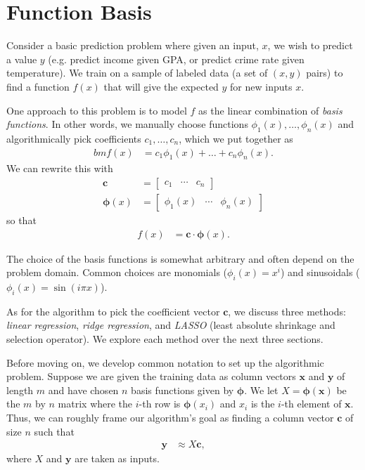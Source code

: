 \documentclass[10pt]{paper}
\begin{document}
\section{Function Basis}
Consider a basic prediction problem where given an input, $x$, we wish to predict a value $y$ (e.g. predict income given GPA, or predict crime rate given temperature). We train on a sample of labeled data (a set of $(x,y)$ pairs) to find a function $f(x)$ that will give the expected $y$ for new inputs $x$.

One approach to this problem is to model $f$ as the linear combination of \emph{basis functions}. In other words, we manually choose functions $\phi_1(x), \dots, \phi_n(x)$ and algorithmically pick coefficients $c_1, \dots, c_n$, which we put together as
\begin{align*}bm
f(x) &= c_1 \phi_1(x) + \dots + c_n \phi_n(x).
\end{align*}
We can rewrite this with 
\begin{align*}
\bm{c} &= \begin{bmatrix} c_1 & \cdots & c_n \end{bmatrix} \\
\bm{\phi}(x) &= \begin{bmatrix} \phi_1(x) & \cdots & \phi_n(x) \end{bmatrix}
\end{align*}
so that 
\begin{align}
f(x) &= \bm{c} \cdot \bm{\phi}(x). \label{eq:predictor}
\end{align}

The choice of the basis functions is somewhat arbitrary and often depend on the problem domain. Common choices are monomials ($\phi_i(x) = x^i$) and sinusoidals ($\phi_i(x) = \sin(i \pi x)$).

As for the algorithm to pick the coefficient vector $\bm{c}$, we discuss three methods: \emph{linear regression}, \emph{ridge regression}, and \emph{LASSO} (least absolute shrinkage and selection operator). We explore each method over the next three sections.

Before moving on, we develop common notation to set up the algorithmic problem. Suppose we are given the training data as column vectors $\bm{x}$ and $\bm{y}$ of length $m$ and have chosen $n$ basis functions given by $\bm{\phi}$. We let $X = \bm{\phi}(\bm{x})$ be the $m$ by $n$ matrix where the $i$-th row is $\bm{\phi}(x_i)$ and $x_i$ is the $i$-th element of $\bm{x}$. Thus, we can roughly frame our algorithm's goal as finding a column vector $\bm{c}$ of size $n$ such that
\begin{align}
\bm{y} &\approx X \bm{c}, \label{eq:problem}
\end{align}
where $X$ and $\bm{y}$ are taken as inputs.
\end{document}
